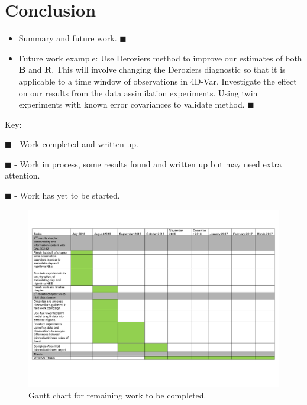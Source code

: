 \documentclass[11pt]{article}
\begin{document}
\section{Conclusion}
\begin{itemize}
\item Summary and future work. {\color{red} $\blacksquare$}
\item Future work example: Use Deroziers method to improve our estimates of both $\textbf{B}$ and $\textbf{R}$. This will involve changing the Deroziers diagnostic so that it is applicable to a time window of observations in 4D-Var. Investigate the effect on our results from the data assimilation experiments. Using twin experiments with known error covariances to validate method. {\color{red} $\blacksquare$}
\end{itemize}
\hspace{10mm}

Key:

{\color{green} $\blacksquare$} - Work completed and written up.

{\color{yellow} $\blacksquare$} - Work in process, some results found and written up but may need extra attention.

{\color{red} $\blacksquare$} - Work has yet to be started.


\begin{figure}
    \includegraphics[width=1.\textwidth]{Tasks.pdf}
    \caption{Gantt chart for remaining work to be completed.}
    \label{fig:PropProf}
\end{figure}
\end{document}
